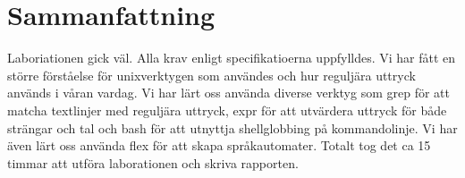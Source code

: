 \section{Sammanfattning}
Laboriationen gick väl. Alla krav enligt specifikatioerna uppfylldes. Vi har fått en större förståelse för unixverktygen som användes och hur reguljära uttryck används i våran vardag. Vi har lärt oss använda diverse verktyg som grep för att matcha textlinjer med reguljära uttryck, expr för att utvärdera uttryck för både strängar och tal och bash för att utnyttja shellglobbing på kommandolinje. Vi har även lärt oss använda flex för att skapa språkautomater. Totalt tog det ca 15 timmar att utföra laborationen och skriva rapporten. 
